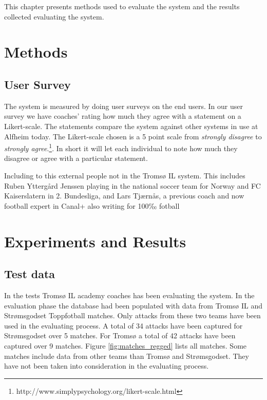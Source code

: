 This chapter presents methods used to evaluate the system and the results collected evaluating the system. 

\section{Methods}

\subsection{User Survey}

The system is measured by doing user surveys on the end users. In our user survey we have coaches’ rating how much they agree with a statement on a Likert-scale. The statements compare the system against other systems in use at Alfheim today. The Likert-scale chosen is a 5 point scale from \textit{strongly disagree} to \textit{strongly agree}.\footnote{http://www.simplypsychology.org/likert-scale.html}. In short it will let each individual to note how much they disagree or agree with a particular statement.

Including to this external people not in the Tromsø IL system. This includes Ruben Yttergård Jenssen playing in the national soccer team for Norway and FC Kaiserslatern in 2. Bundesliga, and Lars Tjærnås, a previous coach and now football expert in Canal+ also writing for 100‰ fotball

\section{Experiments and Results}

\subsection{Test data}

In the tests Tromsø IL academy coaches has been evaluating the system. In the evaluation phase the database had been populated with data from Tromsø IL and Strømsgodset Toppfotball matches. Only attacks from these two teams have been used in the evaluating process. A total of 34 attacks have been captured for Strømsgodset over 5 matches. For Tromsø a total of 42 attacks have been captured over 9 matches. Figure \ref{fig:matches_regged} lists all matches. Some matches include data from other teams than Tromsø and Strømsgodset. They have not been taken into consideration in the evaluating process.

